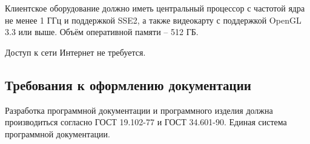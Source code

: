 Клиентское оборудование должно иметь центральный процессор с частотой ядра не менее 1 ГГц и поддержкой SSE2, а также видеокарту с поддержкой OpenGL 3.3 или выше. Объём оперативной памяти -- 512 ГБ.

Доступ к сети Интернет не требуется.

\subsection{Требования к оформлению документации}

Разработка программной документации и программного изделия должна производиться согласно ГОСТ 19.102-77 и ГОСТ 34.601-90. Единая система программной документации.
